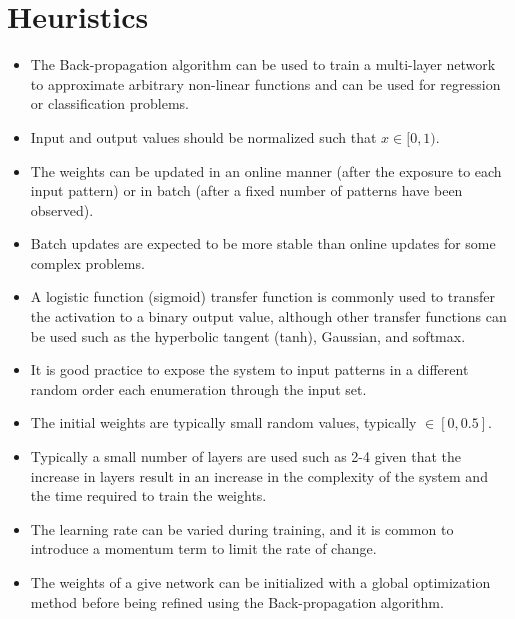 \documentclass[a4paper, 11pt]{article}
\begin{document}
\section{Heuristics}
\label{sec:heuristics}
\begin{itemize}
	\item The Back-propagation algorithm can be used to train a multi-layer network to approximate arbitrary non-linear functions and can be used for regression or classification problems.
	\item Input and output values should be normalized such that $x \in [0,1)$.
	\item The weights can be updated in an online manner (after the exposure to each input pattern) or in batch (after a fixed number of patterns have been observed).
	\item Batch updates are expected to be more stable than online updates for some complex problems.
	\item A logistic function (sigmoid) transfer function is commonly used to transfer the activation to a binary output value, although other transfer functions can be used such as the hyperbolic tangent (tanh), Gaussian, and softmax.
	\item It is good practice to expose the system to input patterns in a different random order each enumeration through the input set.
	\item The initial weights are typically small random values, typically $\in [0, 0.5]$.
	\item Typically a small number of layers are used such as 2-4 given that the increase in layers result in an increase in the complexity of the system and the time required to train the weights.
	\item The learning rate can be varied during training, and it is common to introduce a momentum term to limit the rate of change.
	\item The weights of a give network can be initialized with a global optimization method before being refined using the Back-propagation algorithm.
\end{itemize}

\end{document}
